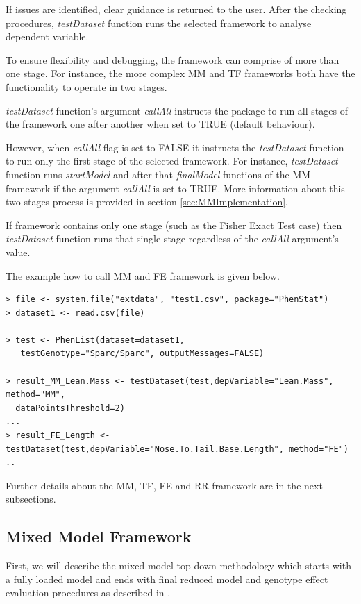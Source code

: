 \documentclass[12pt,a4paper]{article}
\begin{document}
If issues are identified, clear guidance is returned to the user. 
After the checking procedures, \textit{testDataset} function runs the selected framework to analyse dependent variable. 

To ensure flexibility and debugging, the framework can comprise of more than one stage. For instance, the more complex MM and TF frameworks both have the functionality to operate in two stages.

\textit{testDataset} function's argument \textit{callAll} instructs the package to run all stages of the framework one after another when set to TRUE (default behaviour). 

However, when \textit{callAll} flag is set to FALSE it instructs the \textit{testDataset} function to run only the first stage of the selected framework.
For instance, \textit{testDataset} function runs \textit{startModel} and after that \textit{finalModel} functions of the MM framework if the argument \textit{callAll} is set to TRUE.  More information about this two stages process is provided in section \ref{sec:MMImplementation}.

If framework contains only one stage (such as the Fisher Exact Test case) then \textit{testDataset} function runs that single stage regardless of the \textit{callAll} argument's value. 

The example how to call MM and FE framework is given below.


\begingroup
    \fontsize{8pt}{12pt}\selectfont
\begin{verbatim}
> file <- system.file("extdata", "test1.csv", package="PhenStat") 
> dataset1 <- read.csv(file)

> test <- PhenList(dataset=dataset1,
   testGenotype="Sparc/Sparc", outputMessages=FALSE)

> result_MM_Lean.Mass <- testDataset(test,depVariable="Lean.Mass", method="MM",
  dataPointsThreshold=2)
...
> result_FE_Length <- testDataset(test,depVariable="Nose.To.Tail.Base.Length", method="FE")
..
\end{verbatim}
\endgroup

Further details about the MM, TF, FE and RR framework are in the next subsections.

\subsection{Mixed Model Framework}
First, we will describe the mixed model top-down methodology which starts with a fully loaded model and ends with final reduced model and genotype effect evaluation procedures as described in \cite{MM07}. 
\end{document}
